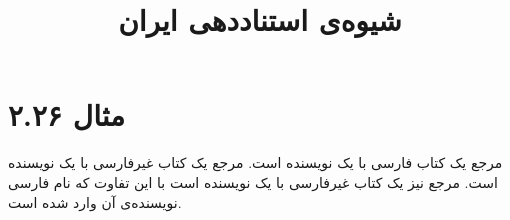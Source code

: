 \documentclass[a4paper,10pt]{article}
\def\examplenumber{مثال ۲.۲۶}
\begin{document}
\title{شیوه‌ی استناددهی ایران}
\author{}
\date{}
\maketitle



\section*{\examplenumber}

مرجع \cite{کمالزاده1388} یک کتاب فارسی با یک نویسنده است. مرجع \cite{kasper1999} یک کتاب غیرفارسی با یک نویسنده است. مرجع \cite{salinger1951} نیز یک کتاب غیرفارسی با یک نویسنده است با این تفاوت که نام فارسی نویسنده‌ی آن وارد شده است.






\end{document}
